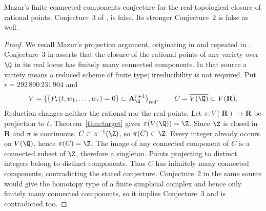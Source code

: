 \begin{corollary}
\label{cor:mazur}
Mazur's
finite-connected-components conjecture for the real-topological closure
of rational points, Conjecture~3 of \cite{mazur1992,mazur1995}, is
false. Its stronger Conjecture~2 is false as well.
\end{corollary}
\begin{proof}
We recall Mazur's projection argument, originating in
\cite{mazur1992} and repeated in \cite[p.~166]{mazur1995}.
Conjecture~3 in \cite[p.~165]{mazur1995} asserts that the closure
of the rational points of any variety over $\Q$ in its real locus has
finitely many connected components. In that source a variety means a
reduced scheme of finite type; irreducibility is not required.
Put $r=292\,890\,231\,904$ and
\[
 V=\bigl(\{P_*(t,w_1,\ldots,w_r)=0\}\subset\mathbf A^{r+1}_{\Q}\bigr)_{\rm red},
 \qquad C=\overline{V(\Q)}\subset V(\mathbf R).
\]
Reduction changes neither the rational nor the real points. Let
$\pi:V(\mathbf R)\to\mathbf R$ be projection to $t$.
Theorem~\ref{thm:target} gives $\pi(V(\Q))=\Z$. Since $\Z$ is closed in $\mathbf R$
and $\pi$ is continuous, $C\subset\pi^{-1}(\Z)$, so $\pi(C)\subset\Z$.
Every integer already occurs on $V(\Q)$, hence $\pi(C)=\Z$.
The image of any connected component of $C$ is a connected subset of
$\Z$, therefore a singleton. Points projecting to distinct integers
belong to distinct components. Thus $C$ has infinitely many connected
components, contradicting the stated conjecture. Conjecture~2 in
the same source would give the homotopy type of a finite simplicial
complex and hence only finitely many connected components, so it
implies Conjecture~3 and is contradicted too.
\end{proof}

